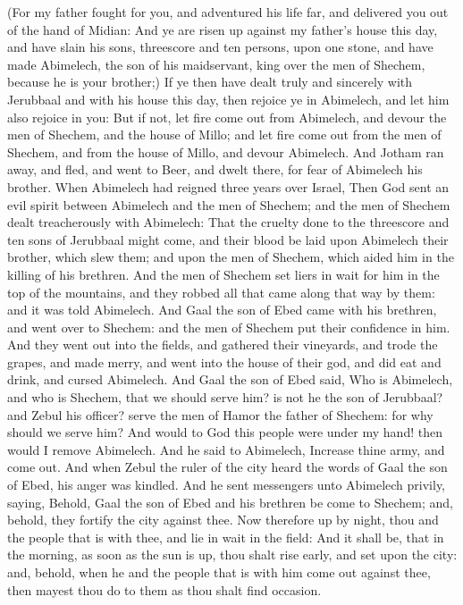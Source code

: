 \begin{biblechapter}
\verse (For my father fought for you, and adventured his life far, and delivered you out of the hand of Midian:
\verse And ye are risen up against my father's house this day, and have slain his sons, threescore and ten persons, upon one stone, and have made Abimelech, the son of his maidservant, king over the men of Shechem, because he is your brother;)
\verse If ye then have dealt truly and sincerely with Jerubbaal and with his house this day, then rejoice ye in Abimelech, and let him also rejoice in you:
\verse But if not, let fire come out from Abimelech, and devour the men of Shechem, and the house of Millo; and let fire come out from the men of Shechem, and from the house of Millo, and devour Abimelech.
\verse And Jotham ran away, and fled, and went to Beer, and dwelt there, for fear of Abimelech his brother.
\verse When Abimelech had reigned three years over Israel,
\verse Then God sent an evil spirit between Abimelech and the men of Shechem; and the men of Shechem dealt treacherously with Abimelech:
\verse That the cruelty done to the threescore and ten sons of Jerubbaal might come, and their blood be laid upon Abimelech their brother, which slew them; and upon the men of Shechem, which aided him in the killing of his brethren.
\verse And the men of Shechem set liers in wait for him in the top of the mountains, and they robbed all that came along that way by them: and it was told Abimelech.
\verse And Gaal the son of Ebed came with his brethren, and went over to Shechem: and the men of Shechem put their confidence in him.
\verse And they went out into the fields, and gathered their vineyards, and trode the grapes, and made merry, and went into the house of their god, and did eat and drink, and cursed Abimelech.
\verse And Gaal the son of Ebed said, Who is Abimelech, and who is Shechem, that we should serve him? is not he the son of Jerubbaal? and Zebul his officer? serve the men of Hamor the father of Shechem: for why should we serve him?
\verse And would to God this people were under my hand! then would I remove Abimelech. And he said to Abimelech, Increase thine army, and come out.
\verse And when Zebul the ruler of the city heard the words of Gaal the son of Ebed, his anger was kindled.
\verse And he sent messengers unto Abimelech privily, saying, Behold, Gaal the son of Ebed and his brethren be come to Shechem; and, behold, they fortify the city against thee.
\verse Now therefore up by night, thou and the people that is with thee, and lie in wait in the field:
\verse And it shall be, that in the morning, as soon as the sun is up, thou shalt rise early, and set upon the city: and, behold, when he and the people that is with him come out against thee, then mayest thou do to them as thou shalt find occasion.

\end{biblechapter}
